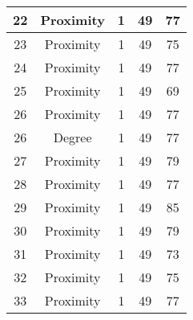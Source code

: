 \documentclass[results.tex]{subfiles}
\begin{document}
\begin{center}
\begin{tabular}{| c || c | c | c | c |}
            \hline
            22                      & Proximity                    & 1                      & 49                      & 77                   \\
            \hline
            23                      & Proximity                    & 1                      & 49                      & 75                   \\
            \hline
            24                      & Proximity                    & 1                      & 49                      & 77                   \\
            \hline
            25                      & Proximity                    & 1                      & 49                      & 69                   \\
            \hline
            26                      & Proximity                    & 1                      & 49                      & 77                   \\
            \hline
            26                      & Degree                       & 1                      & 49                      & 77                   \\
            \hline
            27                      & Proximity                    & 1                      & 49                      & 79                   \\
            \hline
            28                      & Proximity                    & 1                      & 49                      & 77                   \\
            \hline
            29                      & Proximity                    & 1                      & 49                      & 85                   \\
            \hline
            30                      & Proximity                    & 1                      & 49                      & 79                   \\
            \hline
            31                      & Proximity                    & 1                      & 49                      & 73                   \\
            \hline
            32                      & Proximity                    & 1                      & 49                      & 75                   \\
            \hline
            33                      & Proximity                    & 1                      & 49                      & 77                   \\

\end{tabular}
\end{center}
\end{document}
